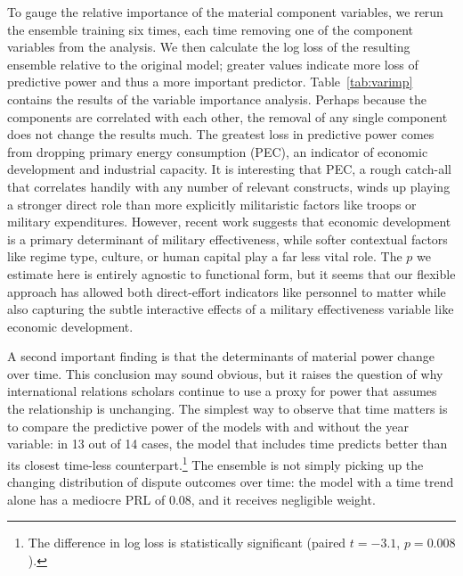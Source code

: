 To gauge the relative importance of the material component variables, we rerun the ensemble training six times, each time removing one of the component variables from the analysis.
We then calculate the log loss of the resulting ensemble relative to the original model; greater values indicate more loss of predictive power and thus a more important predictor.
Table~\ref{tab:varimp} contains the results of the variable importance analysis.
Perhaps because the components are correlated with each other, the removal of any single component does not change the results much.
The greatest loss in predictive power comes from dropping primary energy consumption (PEC), an indicator of economic development and industrial capacity.
It is interesting that PEC, a rough catch-all that correlates handily with any number of relevant constructs, winds up playing a stronger direct role than more explicitly militaristic factors like troops or military expenditures.
However, recent work \citep[e.g.][]{beckley2010economic} suggests that economic development is a primary determinant of military effectiveness, while softer contextual factors like regime type, culture, or human capital play a far less vital role.
The $p$ we estimate here is entirely agnostic to functional form, but it seems that our flexible approach has allowed both direct-effort indicators like personnel to matter while also capturing the subtle interactive effects of a military effectiveness variable like economic development.

A second important finding is that the determinants of material power change over time.
This conclusion may sound obvious, but it raises the question of why international relations scholars continue to use a proxy for power that assumes the relationship is unchanging.
The simplest way to observe that time matters is to compare the predictive power of the models with and without the year variable: in 13 out of 14 cases, the model that includes time predicts better than its closest time-less counterpart.\footnote{%
  The difference in log loss is statistically significant (paired $t = -3.1$, $p = 0.008$).
}
The ensemble is not simply picking up the changing distribution of dispute outcomes over time: the model with a time trend alone has a mediocre PRL of 0.08, and it receives negligible weight.

